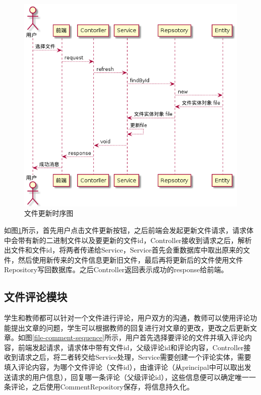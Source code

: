 \begin{figure}[htbp]
    \centering
    \includegraphics[scale = 0.6]{out/uml/时序图/file-refresh-sequence/file-refresh-sequence.png}
    \caption{\song\wuhao 文件更新时序图}
    \label{file-refresh-sequence}
\end{figure}

如图\ref{file-refresh-sequence}所示，首先用户点击文件更新按钮，之后前端会发起更新文件请求，请求体中会带有新的二进制文件以及要更新的文件id，Controller接收到请求之后，解析出文件和文件id，将两者传递给Service，Service首先会重数据库中取出原来的文件，然后使用新传来的文件信息更新旧文件，最后再将更新后的文件使用文件Repository写回数据库。之后Controller返回表示成功的response给前端。

\subsection{文件评论模块}

学生和教师都可以针对一个文件进行评论，用户双方的沟通，教师可以使用评论功能提出文章的问题，学生可以根据教师的回复进行对文章的更改，更改之后更新文章。如图\ref{file-comment-sequence}所示，用户首先选择要评论的文件并填入评论内容，前端发起请求，请求体中带有文件id，父级评论id和评论内容，Controller接收到请求之后，将二者转交给Service处理，Service需要创建一个评论实体，需要填入评论内容，为哪个文件评论（文件id），由谁评论（从principal中可以取出发送请求的用户信息），回复哪一条评论（父级评论id），这些信息便可以确定唯一一条评论，之后使用CommentRepository保存，将信息持久化。

